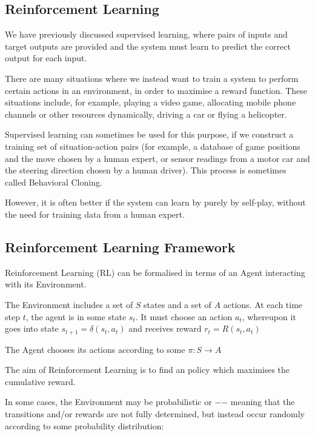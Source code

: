 \documentclass[11pt]{article}
\begin{document}
\subsection{Reinforcement Learning}\label{subsec:reinforcement-learning}
We have previously discussed supervised learning, where pairs of inputs and
target outputs are provided and the system must learn to predict the correct
output for each input.

There are many situations where we instead want to train a system to perform
certain actions in an environment, in order to maximise a reward function.
These situations include, for example, playing a video game, allocating mobile
phone channels or other resources dynamically, driving a car or flying a
helicopter.

Supervised learning can sometimes be used for this purpose, if we construct a
training set of situation-action pairs (for example, a database of game
positions and the move chosen by a human expert, or sensor readings from a
motor car and the steering direction chosen by a human driver).
This process is sometimes called Behavioral Cloning.

However, it is often better if the system can learn by purely by self-play,
without the need for training data from a human expert.

\subsection{Reinforcement Learning Framework}\label{subsec:reinforcement-learning-framework}
Reinforcement Learning (RL) can be formalised in terms of an Agent interacting
with its Environment.

The Environment includes a set of $S$ states and a set of $A$ actions.
At each time step $t$, the agent is in some state $s_t$.
It must choose an action $a_t$, whereupon it goes into state
$s_{t + 1} = \delta (s_t , a_t)$ and receives reward $r_t = R(s_t, a_t)$

The Agent chooses its actions according to some
 $\pi : S \rightarrow A $

The aim of Reinforcement Learning is to find an  policy which
maximises the cumulative reward.

In some cases, the Environment may be probabilistic or  −−
meaning that the transitions and/or rewards are not fully determined, but
instead occur randomly according to some probability distribution:
\end{document}
